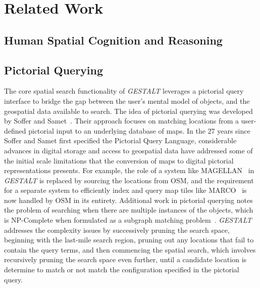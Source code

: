 \section{Related Work}
\label{section:related}


\subsection{Human Spatial Cognition and Reasoning}

\subsection{Pictorial Querying}
The core spatial search functionality of \emph{GESTALT} leverages a pictorial query interface to bridge the gap between the user's mental model of objects, and the geospatial data available to search. 
The idea of pictorial querying was developed by Soffer and Samet~\cite{Soffer1997}.
Their approach focuses on matching locations from a user-defined pictorial input to an underlying database of maps. 
In the 27 years since Soffer and Samet first specified the Pictorial Query Language, considerable advances in digital storage and access to geospatial data have addressed some of the initial scale limitations that the conversion of maps to digital pictorial representations presents. 
For example, the role of a system like MAGELLAN~\cite{Samet1998} in \emph{GESTALT} is replaced by sourcing the locations from OSM, and the requirement for a separate system to efficiently index and query map tiles like MARCO~\cite{Samet1996} is now handled by OSM in its entirety. 
Additional work in pictorial querying notes the problem of searching when there are multiple instances of the objects, which is NP-Complete when formulated as a subgraph matching problem~\cite{Folkers2000}. 
\textit{GESTALT} addresses the complexity issues by successively pruning the search space, beginning with the last-mile search region, pruning out any locations that fail to contain the query terms, and then commencing the spatial search, which involves recursively pruning the search space even further, until a candidate location is determine to match or not match the configuration specified in the pictorial query.





